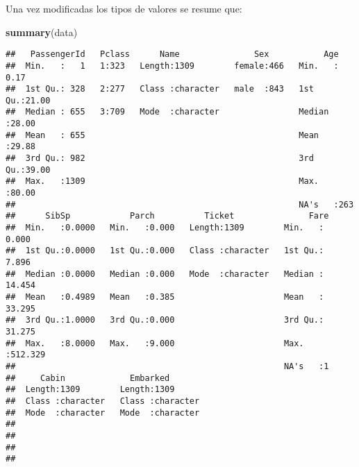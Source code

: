 \documentclass[]{article}
\newenvironment{Shaded}{\begin{snugshade}}{\end{snugshade}}
\newcommand{\KeywordTok}[1]{\textcolor[rgb]{0.13,0.29,0.53}{\textbf{#1}}}
\newcommand{\NormalTok}[1]{#1}
\begin{document}
Una vez modificadas los tipos de valores se resume que:

\begin{Shaded}
\begin{Highlighting}[]
\KeywordTok{summary}\NormalTok{(data)}
\end{Highlighting}
\end{Shaded}

\begin{verbatim}
##   PassengerId   Pclass      Name               Sex           Age       
##  Min.   :   1   1:323   Length:1309        female:466   Min.   : 0.17  
##  1st Qu.: 328   2:277   Class :character   male  :843   1st Qu.:21.00  
##  Median : 655   3:709   Mode  :character                Median :28.00  
##  Mean   : 655                                           Mean   :29.88  
##  3rd Qu.: 982                                           3rd Qu.:39.00  
##  Max.   :1309                                           Max.   :80.00  
##                                                         NA's   :263    
##      SibSp            Parch          Ticket               Fare        
##  Min.   :0.0000   Min.   :0.000   Length:1309        Min.   :  0.000  
##  1st Qu.:0.0000   1st Qu.:0.000   Class :character   1st Qu.:  7.896  
##  Median :0.0000   Median :0.000   Mode  :character   Median : 14.454  
##  Mean   :0.4989   Mean   :0.385                      Mean   : 33.295  
##  3rd Qu.:1.0000   3rd Qu.:0.000                      3rd Qu.: 31.275  
##  Max.   :8.0000   Max.   :9.000                      Max.   :512.329  
##                                                      NA's   :1        
##     Cabin             Embarked        
##  Length:1309        Length:1309       
##  Class :character   Class :character  
##  Mode  :character   Mode  :character  
##                                       
##                                       
##                                       
## 
\end{verbatim}
\end{document}

